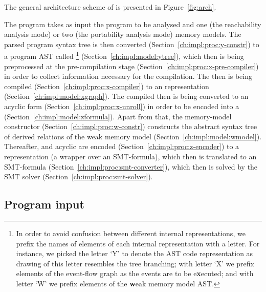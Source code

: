 The general architecture scheme of \porthos[2] is presented in Figure~\ref{fig:arch}.

The program takes as input the program to be analysed and one (the reachability analysis mode) or two (the portability analysis mode) memory models.
The parsed program syntax tree is then converted (Section~\ref{ch:impl:proc:y-constr}) to a program AST called \ytree{}%
%
\footnote{In order to avoid confusion between different internal representations, we prefix the names of elements of each internal representation with a letter. For instance, we picked the letter `Y' to denote the AST code representation as drawing of this letter resembles the tree branching; with letter `X' we prefix elements of the event-flow graph as the events are to be e\textbf{x}ecuted; and with letter `W' we prefix elements of the \textbf{w}eak memory model AST.}%
%
(Section~\ref{ch:impl:model:ytree}), which then is being preprocessed at the pre-compilation stage (Section~\ref{ch:impl:proc:x-pre-compiler}) in order to collect information necessary for the compilation.
The \ytree{} then is being compiled (Section~\ref{ch:impl:proc:x-compiler}) to an \xgraph{} representation (Section~\ref{ch:impl:model:xgraph}).
The compiled \xgraph{} then is being converted to an acyclic form (Section~\ref{ch:impl:proc:x-unroll}) in order to be encoded into a \zformula{} (Section~\ref{ch:impl:model:zformula}).
Apart from that, the memory-model constructor (Section~\ref{ch:impl:proc:w-constr}) constructs the abstract syntax tree of derived relations of the weak memory model \wmodel{} (Section~\ref{ch:impl:model:wmodel}).
Thereafter, \wmodel{} and acyclic \xgraph{} are encoded (Section~\ref{ch:impl:proc:z-encoder}) to a \zformula{} representation (a wrapper over an SMT-formula), which then is translated to an SMT-formula (Section~\ref{ch:impl:proc:smt-converter}), which then is solved by the SMT solver (Section~\ref{ch:impl:proc:smt-solver}).


\subsection{Program input}
\label{ch:impl:input}


